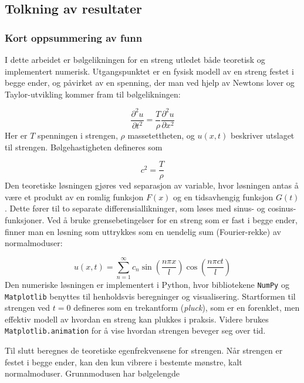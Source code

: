 \subsection{Tolkning av resultater}
\subsubsection{Kort oppsummering av funn}
I dette arbeidet er bølgelikningen for en streng utledet både teoretisk og implementert numerisk. Utgangspunktet er en fysisk modell av en streng festet i begge ender, og påvirket av en spenning, der man ved hjelp av Newtons lover og Taylor-utvikling kommer fram til bølgelikningen:

\begin{equation*}
\frac{\partial^2 u}{\partial t^2} = \frac{T}{\rho} \frac{\partial^2 u}{\partial x^2}
\end{equation*}
Her er \( T \) spenningen i strengen, \( \rho \) massetettheten, og \( u(x, t) \) beskriver utslaget til strengen. Bølgehastigheten defineres som

\begin{equation*}
c^2 = \frac{T}{\rho}
\end{equation*}
Den teoretiske løsningen gjøres ved separasjon av variable, hvor løsningen antas å være et produkt av en romlig funksjon \( F(x) \) og en tidsavhengig funksjon \( G(t) \). Dette fører til to separate differensiallikninger, som løses med sinus- og cosinus-funksjoner. Ved å bruke grensebetingelser for en streng som er fast i begge ender, finner man en løsning som uttrykkes som en uendelig sum (Fourier-rekke) av normalmoduser:

\begin{equation*}
u(x, t) = \sum_{n=1}^{\infty} c_n \sin\left(\frac{n\pi x}{l}\right)\cos\left(\frac{n\pi c t}{l}\right)
\end{equation*}
Den numeriske løsningen er implementert i Python, hvor bibliotekene \texttt{NumPy} og \texttt{Matplotlib} benyttes til henholdsvis beregninger og visualisering. Startformen til strengen ved \( t = 0 \) defineres som en trekantform (\textit{pluck}), som er en forenklet, men effektiv modell av hvordan en streng kan plukkes i praksis. Videre brukes \texttt{Matplotlib.animation} for å vise hvordan strengen beveger seg over tid.

Til slutt beregnes de teoretiske egenfrekvensene for strengen. Når strengen er festet i begge ender, kan den kun vibrere i bestemte mønstre, kalt normalmoduser. Grunnmodusen har bølgelengde

